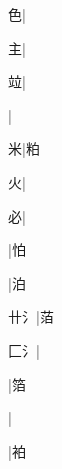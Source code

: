 \begin{multicols}{2}
{{\cjk{}{\cnsym{}　}{\cnsym{}　}色}\mktsJzrVerticalBar{}{\cjk{}{\cnsym{}　}{\cnsym{}　}{\cnsym{}　}}|{}\par
{\cjk{}{\cnsym{}　}{\cnsym{}　}主}\mktsJzrVerticalBar{}{\cjk{}{\cnsym{}　}{\cnsym{}　}{\cnsym{}　}}|{}\par
{\cjk{}{\cnsym{}　}{\cnsym{}　}竝}\mktsJzrVerticalBar{}{\cjk{}{\cnsym{}　}{\cnsym{}　}{\cnsym{}　}}|{}\par
{}\mktsJzrVerticalBar{}{\cjk{}{\cnsym{}　}{\cnsym{}　}{\cnsym{}　}}|{}\par
{\cjk{}{\cnsym{}　}{\cnsym{}　}米}\mktsJzrVerticalBar{}{\cjk{}{\cnsym{}　}{\cnsym{}　}{\cnsym{}　}}|{\cjk{}粕}\par
{\cjk{}{\cnsym{}　}{\cnsym{}　}火}\mktsJzrVerticalBar{}{\cjk{}{\cnsym{}　}{\cnsym{}　}{\cnsym{}　}}|{}\par
{\cjk{}{\cnsym{}　}{\cnsym{}　}必}\mktsJzrVerticalBar{}{\cjk{}{\cnsym{}　}{\cnsym{}　}{\cnsym{}　}}|{}\par
{}\mktsJzrVerticalBar{}{\cjk{}{\cnsym{}　}{\cnsym{}　}{\cnsym{}　}}|{\cjk{}怕}\par
{}\mktsJzrVerticalBar{}{\cjk{}{\cnsym{}　}{\cnsym{}　}{\cnsym{}　}}|{\cjk{}泊}\par
{\cjk{}{\cnsym{}　}卄{\cnxHanaA{}氵}}\mktsJzrVerticalBar{}{\cjk{}{\cnsym{}　}{\cnsym{}　}{\cnsym{}　}}|{\cjk{}萡}\par
{\cjk{}{\cnsym{}　}匚{\cnxHanaA{}氵}}\mktsJzrVerticalBar{}{\cjk{}{\cnsym{}　}{\cnsym{}　}{\cnsym{}　}}|{}\par
{}\mktsJzrVerticalBar{}{\cjk{}{\cnsym{}　}{\cnsym{}　}{\cnsym{}　}}|{\cjk{}箔}\par
{}\mktsJzrVerticalBar{}{\cjk{}{\cnsym{}　}{\cnsym{}　}{\cnsym{}　}}|{}\par
{}\mktsJzrVerticalBar{}{\cjk{}{\cnsym{}　}{\cnsym{}　}{\cnsym{}　}}|{\cjk{}袙}\par
}
\end{multicols}
